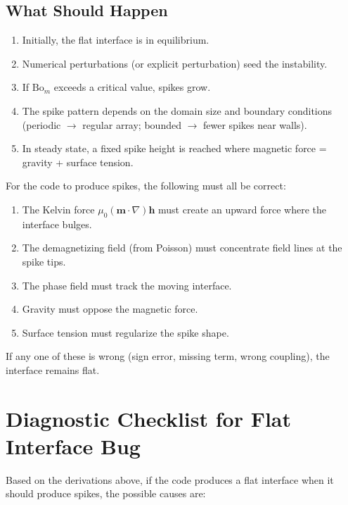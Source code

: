 \documentclass[11pt,a4paper]{article}
\theoremstyle{definition}
\theoremstyle{remark}
\newcommand{\grad}{\nabla}
\newcommand{\bfm}{\bm{m}}
\newcommand{\bfh}{\bm{h}}
\begin{document}
\subsection{What Should Happen}

\begin{enumerate}
  \item Initially, the flat interface is in equilibrium.
  \item Numerical perturbations (or explicit perturbation) seed the instability.
  \item If $\mathrm{Bo}_m$ exceeds a critical value, spikes grow.
  \item The spike pattern depends on the domain size and boundary conditions
        (periodic $\to$ regular array; bounded $\to$ fewer spikes near walls).
  \item In steady state, a fixed spike height is reached where magnetic
        force = gravity + surface tension.
\end{enumerate}

\begin{keypoint}
For the code to produce spikes, the following must all be correct:
\begin{enumerate}[nosep]
  \item The Kelvin force $\mu_0(\bfm\cdot\grad)\bfh$ must create an
        upward force where the interface bulges.
  \item The demagnetizing field (from Poisson) must concentrate field
        lines at the spike tips.
  \item The phase field must track the moving interface.
  \item Gravity must oppose the magnetic force.
  \item Surface tension must regularize the spike shape.
\end{enumerate}
If any one of these is wrong (sign error, missing term, wrong coupling),
the interface remains flat.
\end{keypoint}


\section{Diagnostic Checklist for Flat Interface Bug}
\label{sec:diagnostics}

Based on the derivations above, if the code produces a flat interface
when it should produce spikes, the possible causes are:
\end{document}
